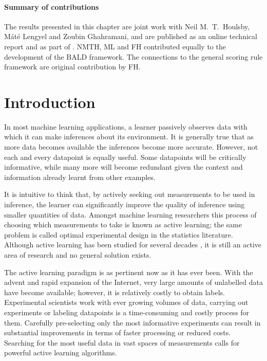 
\paragraph{Summary of contributions} The results presented in this chapter are joint work with Neil M.\ T.\ Houlsby, M\'{a}t\'{e} Lengyel and Zoubin Ghahramani, and are published as an online technical report \citep{Houlsby2011} and as part of \citep{Houlsby2012preference}. NMTH, ML and FH contributed equally to the development of the BALD framework. The connections to the general scoring rule framework are original contribution by FH.

\section{Introduction}

In most machine learning applications, a learner passively observes data with which it can make inferences about its environment. It is generally true that as more data becomes available the inferences become more accurate. However, not each and every datapoint is equally useful. Some datapoints will be critically informative, while many more will become redundant given the context and information already learnt from other examples.

It is intuitive to think that, by actively seeking out measurements to be used in inference, the learner can significantly improve the quality of inference using smaller quantities of data. Amongst machine learning researchers this process of choosing which measurements to take is known as active learning; the same problem is called optimal experimental design in the statistics literature. Although active learning has been studied for several decades \citep{lindley1956,jaynes1986}, it is still an active area of research and no general solution exists.

The active learning paradigm is as pertinent now as it has ever been. With the advent and rapid expansion of the Internet, very large amounts of unlabelled data have become available; however, it is relatively costly to obtain labels. Experimental scientists work with ever growing volumes of data, carrying out experiments or labeling datapoints is a time-consuming and costly process for them. Carefully pre-selecting only the most informative experiments can result in substantial improvements in terms of faster processing or reduced costs. Searching for the most useful data in vast spaces of measurements calls for powerful active learning algorithms.

